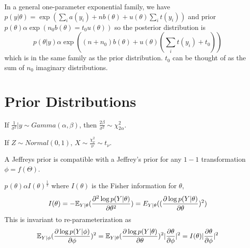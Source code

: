 \begin{thm}
  \label{sec:conjugate-analysis-4}
  In a general one-parameter exponential family, we have $p(y |
  \theta) = \exp(\sum_{i} a(y_{i}) + nb(\theta) + u(\theta)
  \sum_{i}^{} t(y_{i}))$ and prior $p(\theta) \alpha \exp(n_{0}
  b(\theta) = t_{0} u(\theta))$ so the posterior distribution is
  \begin{equation}
    \label{eq:12}
    p(\theta | y) \alpha \exp((n + n_{0})b(\theta) +
    u(\theta)(\sum_{i}^{} t(y_{i}) + t_{0}))
  \end{equation} which is in the same family as the prior
  distribution.  $t_{0}$ can be thought of as the sum of $n_{0}$
  imaginary distributions.
\end{thm}

\section{Prior Distributions}
\label{sec:prior-distributions}

\begin{thm}
  \label{sec:prior-distributions-2}
  If $\frac{1}{\sigma^{2}}|y \sim Gamma(\alpha, \beta)$, then $\frac{2
    \beta}{\sigma^{2}} \sim \chi^{2}_{2 \alpha}$.

  If $Z \sim Normal(0, 1)$, $X \sim \frac{\chi^{2}_{\nu}}{\nu} \sim
  t_{\nu}$.
\end{thm}

\begin{defn}
  \label{sec:prior-distributions-3}
  A Jeffreys prior is compatible with a Jeffrey's prior for any $1-1$
  transformation $\phi = f(\Theta)$.
\item $p_{}(\theta) \alpha I(\theta)^{\frac{1}{2}}$ where $I(\theta)$
  is the Fisher information for $\theta$,
  \begin{equation}
    \label{eq:13}
    I(\theta) = -\E_{Y|\theta}(\frac{\partial^{2} \log
      p(Y|\theta)}{\partial \theta^{2}}) =
    E_{Y|\theta}((\frac{\partial \log p(Y|\theta)}{\partial \theta})^{2})
  \end{equation}
  This is invariant to re-parameterization as
  \begin{align}
    \label{eq:14}
    \E_{Y | \phi}(\frac{\partial \log p(Y| \phi)}{\partial
      \phi})^{2} = \E_{Y|\theta}(\frac{\partial \log
      p(Y|\theta)}{\partial \theta})^{2} |\frac{\partial
      \theta}{\partial \phi} |^{2} = I(\theta) | \frac{\partial
      \theta}{\partial \phi} |^{2}
  \end{align}
\end{defn}

